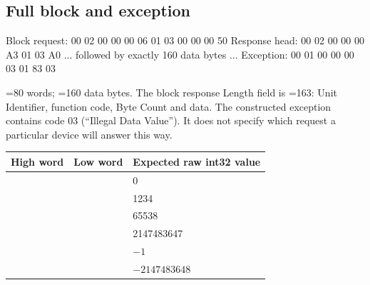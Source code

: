 \documentclass[10pt,a4paper]{article}
\begin{document}
\subsection{Full block and exception}
\begin{CodeBlock}
Block request: 00 02 00 00 00 06 01 03 00 00 00 50
Response head: 00 02 00 00 00 A3 01 03 A0
               ... followed by exactly 160 data bytes ...
Exception:     00 01 00 00 00 03 01 83 03
\end{CodeBlock}
=80 words; =160 data bytes. The block response Length field is =163: Unit Identifier, function code, Byte Count and data. The constructed exception contains code 03 (``Illegal Data Value''). It does not specify which request a particular device will answer this way.

\par\noindent\begin{tabularx}{\linewidth}{@{}L{30mm}L{30mm}X@{}}
\toprule\textbf{High word}&\textbf{Low word}&\textbf{Expected raw int32 value}\\\midrule
{}&&0\\
&&1234\\
&&65538\\
&&2147483647\\
&&$-1$\\
&&$-2147483648$\\\bottomrule
\end{tabularx}\par
\end{document}
